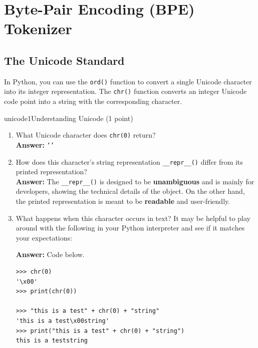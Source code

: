 \section{Byte-Pair Encoding (BPE) Tokenizer}
\subsection{The Unicode Standard}

In Python, you can use the \texttt{ord()} function to convert a single Unicode character into its integer representation.
The \texttt{chr()} function converts an integer Unicode code point into a string with the corresponding character.

\begin{problembox}{unicode1}{Understanding Unicode (1 point)}

    \begin{enumerate}[label=(\alph*), itemsep=0.5em, topsep=0pt]

        \item What Unicode character does \texttt{chr(0)} return? \\
              \textbf{Answer:} \texttt{''}

        \item How does this character's string representation \texttt{__repr__()} differ from its printed representation? \\
              \textbf{Answer:} The \texttt{__repr__()} is designed to be \textbf{unambiguous} and is mainly for developers, showing the technical details of the object. On the other hand, the printed representation is meant to be \textbf{readable} and user-friendly.

        \item What happens when this character occurs in text? It may be helpful to play around with the following in your Python interpreter and see if it matches your expectations:

              \textbf{Answer:} Code below.

              \begin{verbatim}
>>> chr(0)
'\x00'
>>> print(chr(0))

>>> "this is a test" + chr(0) + "string"
'this is a test\x00string'
>>> print("this is a test" + chr(0) + "string")
this is a teststring
\end{verbatim}

    \end{enumerate}

\end{problembox}

